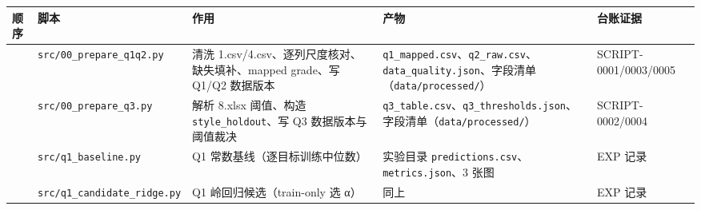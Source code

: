 \documentclass[
  11pt,
]{ctexart}
\newcounter{none} %
\begin{document}
{\def\LTcaptype{none} %
\begin{longtable}[]{@{}
  >{\raggedright\arraybackslash}p{}
  >{\raggedright\arraybackslash}p{}
  >{\raggedright\arraybackslash}p{}
  >{\raggedright\arraybackslash}p{}
  >{\raggedright\arraybackslash}p{}@{}}
\toprule\noalign{}
\begin{minipage}[b]{\linewidth}\raggedright
顺序
\end{minipage} & \begin{minipage}[b]{\linewidth}\raggedright
脚本
\end{minipage} & \begin{minipage}[b]{\linewidth}\raggedright
作用
\end{minipage} & \begin{minipage}[b]{\linewidth}\raggedright
产物
\end{minipage} & \begin{minipage}[b]{\linewidth}\raggedright
台账证据
\end{minipage} \\
\midrule\noalign{}
\endhead
\bottomrule\noalign{}
\endlastfoot
1 & \texttt{src/\allowbreak{}00\_\allowbreak{}prepare\_\allowbreak{}q1q2.\allowbreak{}py} & 清洗
1.csv/4.csv、逐列尺度核对、缺失填补、mapped grade、写 Q1/Q2 数据版本 &
\texttt{q1\_\allowbreak{}mapped.\allowbreak{}csv}、\texttt{q2\_raw.csv}、\texttt{data\_\allowbreak{}quality.\allowbreak{}json}、字段清单（\texttt{data/\allowbreak{}processed/\allowbreak{}}）
& SCRIPT-0001/0003/0005 \\
2 & \texttt{src/\allowbreak{}00\_\allowbreak{}prepare\_\allowbreak{}q3.\allowbreak{}py} & 解析 8.xlsx 阈值、构造
\texttt{style\_\allowbreak{}holdout}、写 Q3 数据版本与阈值裁决 &
\texttt{q3\_table.csv}、\texttt{q3\_\allowbreak{}thresholds.\allowbreak{}json}、字段清单（\texttt{data/\allowbreak{}processed/\allowbreak{}}）
& SCRIPT-0002/0004 \\
3 & \texttt{src/\allowbreak{}q1\_\allowbreak{}baseline.\allowbreak{}py} & Q1 常数基线（逐目标训练中位数） &
实验目录 \texttt{predictions.\allowbreak{}csv}、\texttt{metrics.json}、3 张图 & EXP
记录 \\
4 & \texttt{src/\allowbreak{}q1\_\allowbreak{}candidate\_\allowbreak{}ridge.\allowbreak{}py} & Q1 岭回归候选（train-only 选
α） & 同上 & EXP 记录 \\

\end{longtable}}
\end{document}
